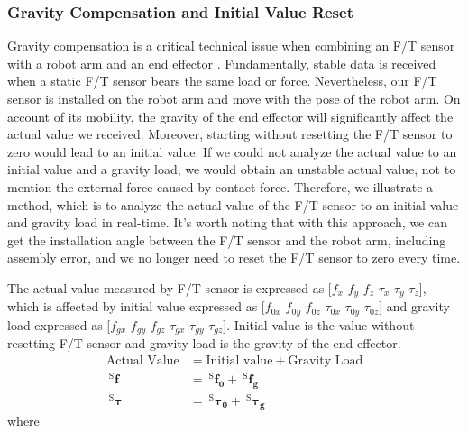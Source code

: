 \subsubsection{Gravity Compensation and Initial Value Reset}
\hspace*{6mm}Gravity compensation is a critical technical issue when combining an F/T sensor with a robot arm and an end effector \cite{8997006}. Fundamentally, stable data is received when a static F/T sensor bears the same load or force. Nevertheless, our F/T sensor is installed on the robot arm and move with the pose of the robot arm. On account of its mobility, the gravity of the end effector will significantly affect the actual value we received. Moreover, starting without resetting the F/T sensor to zero would lead to an initial value. If we could not analyze the actual value to an initial value and a gravity load, we would obtain an unstable actual value, not to mention the external force caused by contact force. Therefore, we illustrate a method, which is to analyze the actual value of the F/T sensor to an initial value and gravity load in real-time. It's worth noting that with this approach, we can get the installation angle between the F/T sensor and the robot arm, including assembly error, and we no longer need to reset the F/T sensor to zero every time.
\par
The actual value measured by F/T sensor is expressed as [$f_{x}$ $f_{y}$ $f_{z}$ $\tau_{x}$ $\tau_{y}$ $\tau_{z}$], which is affected by initial value expressed as [$f_{0x}$ $f_{0y}$ $f_{0z}$ $\tau_{0x}$ $\tau_{0y}$ $\tau_{0z}$] and gravity load expressed as [$f_{gx}$ $f_{gy}$ $f_{gz}$ $\tau_{gx}$ $\tau_{gy}$ $\tau_{gz}$]. Initial value is the value without resetting F/T sensor and gravity load is the gravity of the end effector.
\begin{equation}\label{eq:gc_iga}
\begin{split}
\text{Actual Value} &= \text{Initial value}	+ \text{Gravity Load}\\
\ ^\mathrm{S}\!\boldsymbol{f} 		&= \ ^\mathrm{S}\!\boldsymbol{f_0}		+ \ ^\mathrm{S}\!\boldsymbol{f_g}	\\ 
\ ^\mathrm{S}\boldsymbol{\tau}	&= \ ^\mathrm{S}\boldsymbol{\tau_0}	+ \ ^\mathrm{S}\boldsymbol{\tau_g}
\end{split}
\end{equation}
where 
